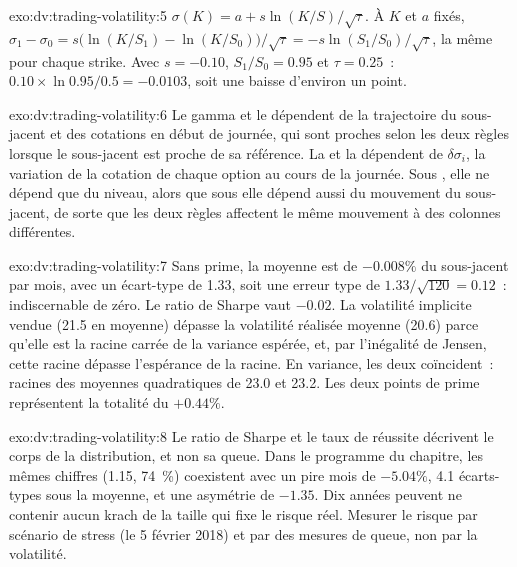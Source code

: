\begin{solution}{exo:dv:trading-volatility:5}
$\sigma(K)=a+s\ln(K/S)/\sqrt\tau$. À $K$ et $a$ fixés, $\sigma_1-\sigma_0=s\bigl(\ln(K/S_1)-\ln(K/S_0)\bigr)/\sqrt\tau=-s\ln(S_1/S_0)/\sqrt\tau$, la même pour
chaque strike. Avec $s=-0.10$, $S_1/S_0=0.95$ et $\tau=0.25$~: $0.10\times\ln0.95/0.5=-0.0103$, soit une baisse d'environ un point.
\end{solution}

\begin{solution}{exo:dv:trading-volatility:6}
Le gamma et le  dépendent de la trajectoire du sous-jacent et des cotations en début de journée, qui sont proches selon les deux règles lorsque le sous-jacent est proche
de sa référence. La  et la  dépendent de $\delta\sigma_i$, la variation de la cotation de chaque option au cours de la journée. Sous , elle ne dépend que du niveau,
alors que sous  elle dépend aussi du mouvement du sous-jacent, de sorte que les deux règles affectent le même mouvement à des colonnes différentes.
\end{solution}

\begin{solution}{exo:dv:trading-volatility:7}
Sans prime, la moyenne est de $-0.008\%$ du sous-jacent par mois, avec un écart-type de 1.33, soit une erreur type de $1.33/\sqrt{120}=0.12$~: indiscernable
de zéro. Le ratio de Sharpe vaut $-0.02$. La volatilité implicite vendue (21.5 en moyenne) dépasse la volatilité réalisée moyenne (20.6) parce qu'elle est la racine carrée de la
variance espérée, et, par l'inégalité de Jensen, cette racine dépasse l'espérance de la racine. En variance, les deux coïncident~: racines des moyennes quadratiques de 23.0 et 23.2. Les deux
points de prime représentent la totalité du $+0.44\%$.
\end{solution}

\begin{solution}{exo:dv:trading-volatility:8}
Le ratio de Sharpe et le taux de réussite décrivent le corps de la distribution, et non sa queue. Dans le programme du chapitre, les mêmes chiffres (1.15, 74~\%) coexistent avec un
pire mois de $-5.04\%$, 4.1 écarts-types sous la moyenne, et une asymétrie de $-1.35$. Dix années peuvent ne contenir aucun krach de la taille qui fixe le risque réel. Mesurer le
risque par scénario de stress (le 5 février 2018) et par des mesures de queue, non par la volatilité.
\end{solution}

